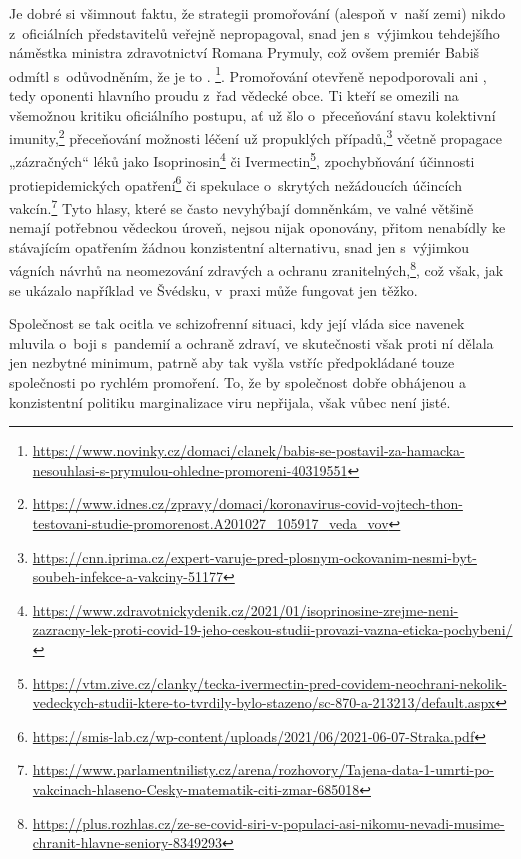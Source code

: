 Je dobré si všimnout faktu, že strategii promořování (alespoň v~naší zemi) nikdo z~oficiálních představitelů veřejně nepropagoval, snad jen s~výjimkou tehdejšího náměstka ministra zdravotnictví Romana Prymuly, což ovšem premiér Babiš odmítl s~odůvodněním, že je to . \footnote{\url{https://www.novinky.cz/domaci/clanek/babis-se-postavil-za-hamacka-nesouhlasi-s-prymulou-ohledne-promoreni-40319551}}. Promořování otevřeně nepodporovali ani , tedy oponenti hlavního proudu z~řad vědecké obce. Ti kteří se omezili na všemožnou kritiku oficiálního postupu, ať už šlo o~přeceňování stavu kolektivní imunity,\footnote{\url{https://www.idnes.cz/zpravy/domaci/koronavirus-covid-vojtech-thon-testovani-studie-promorenost.A201027_105917_veda_vov}} přeceňování možnosti léčení už propuklých případů,\footnote{\url{https://cnn.iprima.cz/expert-varuje-pred-plosnym-ockovanim-nesmi-byt-soubeh-infekce-a-vakciny-51177}} včetně propagace „zázračných“ léků jako Isoprinosin\footnote{\url{https://www.zdravotnickydenik.cz/2021/01/isoprinosine-zrejme-neni-zazracny-lek-proti-covid-19-jeho-ceskou-studii-provazi-vazna-eticka-pochybeni/}} či Ivermectin\footnote{\url{https://vtm.zive.cz/clanky/tecka-ivermectin-pred-covidem-neochrani-nekolik-vedeckych-studii-ktere-to-tvrdily-bylo-stazeno/sc-870-a-213213/default.aspx}}, zpochybňování účinnosti protiepidemických opatření\footnote{\url{https://smis-lab.cz/wp-content/uploads/2021/06/2021-06-07-Straka.pdf}} či spekulace o~skrytých nežádoucích účincích vakcín.\footnote{\url{https://www.parlamentnilisty.cz/arena/rozhovory/Tajena-data-1-umrti-po-vakcinach-hlaseno-Cesky-matematik-citi-zmar-685018}} Tyto  hlasy, které se často nevyhýbají domněnkám, ve valné většině nemají potřebnou vědeckou úroveň, nejsou nijak oponovány, přitom nenabídly ke stávajícím opatřením žádnou konzistentní alternativu, snad jen s~výjimkou vágních návrhů na neomezování zdravých a ochranu zranitelných,\footnote{\url{https://plus.rozhlas.cz/ze-se-covid-siri-v-populaci-asi-nikomu-nevadi-musime-chranit-hlavne-seniory-8349293}}, což však, jak se ukázalo například ve Švédsku, v~praxi může fungovat jen těžko. 

Společnost se tak ocitla ve schizofrenní situaci, kdy její vláda sice navenek mluvila o~boji s~pandemií a ochraně zdraví, ve skutečnosti však proti ní dělala jen nezbytné minimum, patrně aby tak vyšla vstříc předpokládané touze společnosti po rychlém promoření. To, že by společnost dobře obhájenou a konzistentní politiku marginalizace viru nepřijala, však vůbec není jisté.

